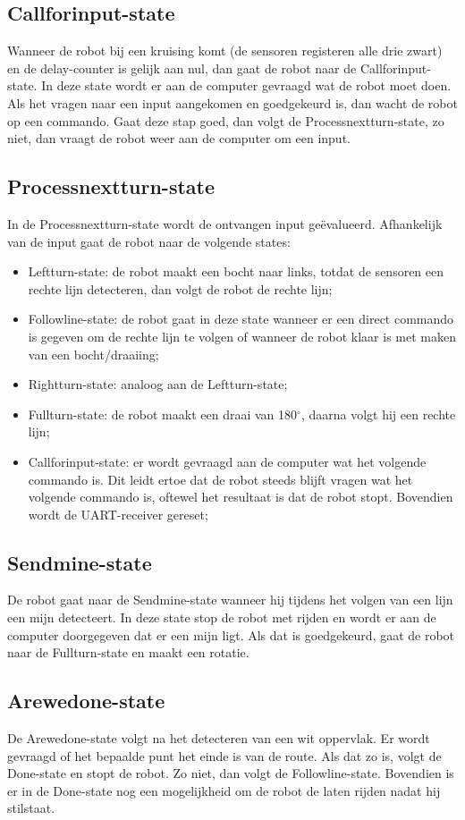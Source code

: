 \documentclass{report}
\begin{document}
\subsection{Callforinput-state}
Wanneer de robot bij een kruising komt (de sensoren registeren alle drie zwart) en de delay-counter is gelijk aan nul, dan gaat de robot naar de Callforinput-state.
In deze state wordt er aan de computer gevraagd wat de robot moet doen.
Als het vragen naar een input aangekomen en goedgekeurd is, dan wacht de robot op een commando.
Gaat deze stap goed, dan volgt de Processnextturn-state, zo niet, dan vraagt de robot weer aan de computer om een input.

\subsection{Processnextturn-state}
In de Processnextturn-state wordt de ontvangen input ge\"{e}valueerd.
Afhankelijk van de input gaat de robot naar de volgende states:
\begin{itemize}
\item Leftturn-state: de robot maakt een bocht naar links, totdat de sensoren een rechte lijn detecteren, dan volgt de robot de rechte lijn;
\item Followline-state: de robot gaat in deze state wanneer er een direct commando is gegeven om de rechte lijn te volgen of wanneer de robot klaar is met maken van een bocht/draaiing;
\item Rightturn-state: analoog aan de Leftturn-state;
\item Fullturn-state: de robot maakt een draai van 180$^\circ$, daarna volgt hij een rechte lijn;
\item Callforinput-state: er wordt gevraagd aan de computer wat het volgende commando is.
Dit leidt ertoe dat de robot steeds blijft vragen wat het volgende commando is, oftewel het resultaat is dat de robot stopt.
Bovendien wordt de UART-receiver gereset;
\end{itemize} 

\subsection{Sendmine-state}
De robot gaat naar de Sendmine-state wanneer hij tijdens het volgen van een lijn een mijn detecteert.
In deze state stop de robot met rijden en wordt er aan de computer doorgegeven dat er een mijn ligt.
Als dat is goedgekeurd, gaat de robot naar de Fullturn-state en maakt een rotatie.

\subsection{Arewedone-state}
De Arewedone-state volgt na het detecteren van een wit oppervlak.
Er wordt gevraagd of het bepaalde punt het einde is van de route.
Als dat zo is, volgt de Done-state en stopt de robot.
Zo niet, dan volgt de Followline-state.
Bovendien is er in de Done-state nog een mogelijkheid om de robot de laten rijden nadat hij stilstaat.
\end{document}
